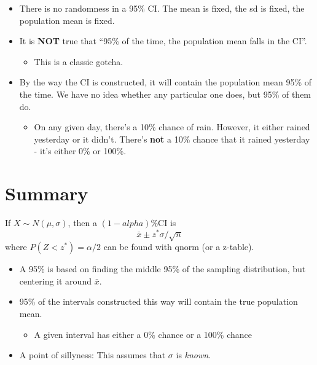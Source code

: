 \documentclass[
  letterpaper,
  DIV=11,
  numbers=noendperiod]{scrreprt}
\providecommand{\tightlist}{%
  \setlength{\itemsep}{0pt}\setlength{\parskip}{0pt}}\usepackage{longtable,booktabs,array}
\begin{document}
\begin{itemize}
\tightlist
\item
  There is no randomness in a 95\% CI. The mean is fixed, the sd is
  fixed, the population mean is fixed.
\item
  It is \textbf{NOT} true that ``95\% of the time, the population mean
  falls in the CI''.

  \begin{itemize}
  \tightlist
  \item
    This is a classic gotcha.
  \end{itemize}
\item
  By the way the CI is constructed, it will contain the population mean
  95\% of the time. We have no idea whether any particular one does, but
  95\% of them do.

  \begin{itemize}
  \tightlist
  \item
    On any given day, there's a 10\% chance of rain. However, it either
    rained yesterday or it didn't. There's \textbf{not} a 10\% chance
    that it rained yesterday - it's either 0\% or 100\%.
  \end{itemize}
\end{itemize}

\hypertarget{summary-3}{%
\section{Summary}\label{summary-3}}

If \(X\sim N(\mu,\sigma)\), then a \((1-alpha)\%\)CI is \[
\bar x \pm z^*\sigma/\sqrt{n}
\] where \(P(Z < z^*) = \alpha/2\) can be found with qnorm (or a
z-table).

\begin{itemize}
\tightlist
\item
  A 95\% is based on finding the middle 95\% of the sampling
  distribution, but centering it around \(\bar x\).
\item
  95\% of the intervals constructed this way will contain the true
  population mean.

  \begin{itemize}
  \tightlist
  \item
    A given interval has either a 0\% chance or a 100\% chance
  \end{itemize}
\item
  A point of sillyness: This assumes that \(\sigma\) is \emph{known}.
\end{itemize}
\end{document}
